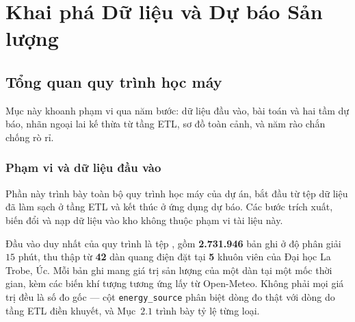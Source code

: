 \documentclass[12pt, a4paper]{report}
\begin{document}
\newpage
\setcounter{topnumber}{3}
\setcounter{bottomnumber}{2}
\setcounter{totalnumber}{4}
\renewcommand{\topfraction}{0.92}
\renewcommand{\bottomfraction}{0.7}
\renewcommand{\textfraction}{0.06}
\renewcommand{\floatpagefraction}{0.85}

\chapter{Khai phá Dữ liệu và Dự báo Sản lượng}
\label{chap:forecasting}

%

\FloatBarrier
\section{Tổng quan quy trình học máy}

Mục này khoanh phạm vi qua năm bước: dữ liệu đầu vào, bài toán và hai tầm dự báo, nhãn
ngoại lai kế thừa từ tầng ETL, sơ đồ toàn cảnh, và năm rào chắn chống rò rỉ.

\FloatBarrier
\subsection{Phạm vi và dữ liệu đầu vào}

Phần này trình bày toàn bộ quy trình học máy của dự án, bắt đầu từ tệp dữ liệu đã
làm sạch ở tầng ETL và kết thúc ở ứng dụng dự báo. Các bước trích xuất, biến đổi và
nạp dữ liệu vào kho không thuộc phạm vi tài liệu này.

Đầu vào duy nhất của quy trình là tệp ,
gồm \textbf{2.731.946} bản ghi ở độ phân giải $15$ phút, thu thập từ \textbf{42} dàn
quang điện đặt tại \textbf{5} khuôn viên của Đại học La Trobe, Úc. Mỗi bản ghi mang
giá trị sản lượng của một dàn tại một mốc thời gian, kèm các biến khí tượng tương ứng lấy từ
Open-Meteo. Không phải mọi giá trị đều là số đo gốc --- cột \texttt{energy\_source} phân biệt dòng
đo thật với dòng do tầng ETL điền khuyết, và Mục~$2.1$ trình bày tỷ lệ từng loại.
\end{document}
